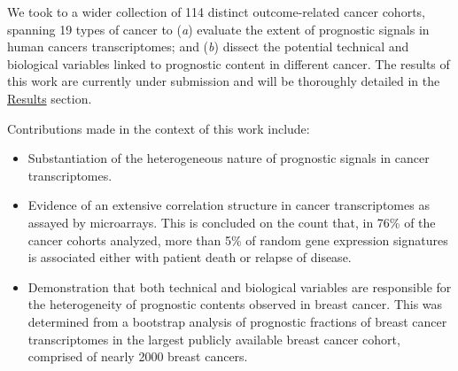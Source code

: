 We took to a wider collection of 114 distinct \mbox{outcome-related} cancer
cohorts, spanning 19 types of cancer to (\emph{a}) evaluate the extent of
prognostic signals in human cancers transcriptomes; and (\emph{b}) dissect the
potential technical and biological variables linked to prognostic content in
different cancer.  The results of this work are currently under submission and
will be thoroughly detailed in the \hyperref[chap:results]{\textsf{Results}}
section.

\medskip

Contributions made in the context of this work include:
\begin{itemize}
\item Substantiation of the heterogeneous nature of prognostic signals in cancer
  transcriptomes.
\item Evidence of an extensive correlation structure in cancer transcriptomes as
  assayed by microarrays.  This is concluded on the count that, in 76\% of the
  cancer cohorts analyzed, more than 5\% of random gene expression signatures is
  associated either with patient death or relapse of disease.
\item Demonstration that both technical and biological variables are responsible
  for the heterogeneity of prognostic contents observed in breast cancer.  This
  was determined from a bootstrap analysis of prognostic fractions of breast
  cancer transcriptomes in the largest publicly available breast cancer cohort,
  comprised of nearly 2000 breast cancers.
\end{itemize}



